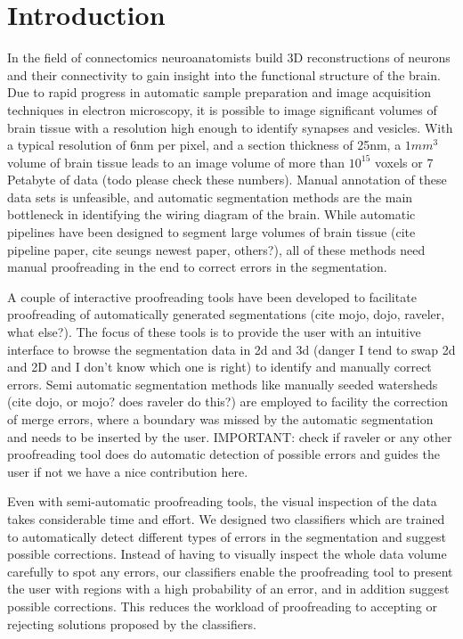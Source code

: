 \section{Introduction}

In the field of connectomics neuroanatomists build 3D reconstructions of neurons and their connectivity to gain insight into the functional structure of the brain. Due to rapid progress in automatic sample preparation and image acquisition techniques in electron microscopy, it is possible to image significant volumes of brain tissue with a resolution high enough to identify synapses and vesicles. With a typical resolution of 6nm per pixel, and a section thickness of 25nm, a $1 mm^3$ volume of brain tissue leads to an image volume of more than $10^15$ voxels or 7 Petabyte of data (todo please check these numbers). Manual annotation of these data sets is unfeasible, and automatic segmentation methods are the main bottleneck in identifying the wiring diagram of the brain. While automatic pipelines have been designed to segment large volumes of brain tissue (cite pipeline paper, cite seungs newest paper, others?), all of these methods need manual proofreading in the end to correct errors in the segmentation.  

A couple of interactive proofreading tools have been developed to facilitate proofreading of automatically generated segmentations (cite mojo, dojo, raveler, what else?). The focus of these tools is to provide the user with an intuitive interface to browse the segmentation data in 2d and 3d (danger I tend to swap 2d and 2D and I don't know which one is right) to identify and manually correct errors. Semi automatic segmentation methods like manually seeded watersheds (cite dojo, or mojo? does raveler do this?) are employed to facility the correction of merge errors, where a boundary was missed by the automatic segmentation and needs to be inserted by the user. IMPORTANT: check if raveler or any other proofreading tool does do automatic detection of possible errors and guides the user if not we have a nice contribution here. 

Even with semi-automatic proofreading tools, the visual inspection of the data takes considerable time and effort. We designed two classifiers which are trained to automatically detect different types of errors in the segmentation and suggest possible corrections. Instead of having to visually inspect the whole data volume carefully to spot any errors, our classifiers enable the proofreading tool to present the user with regions with a high probability of an error, and in addition suggest possible corrections. This reduces the workload of proofreading to accepting or rejecting solutions proposed by the classifiers. 

